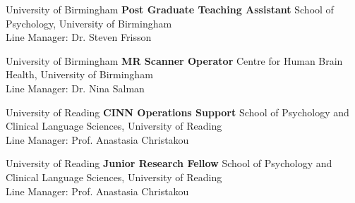 {University of Birmingham}
{\textbf{Post Graduate Teaching Assistant}}
{School of Psychology, University of Birmingham \\
Line Manager: Dr. Steven Frisson}

{University of Birmingham}
{\textbf{MR Scanner Operator}}
{Centre for Human Brain Health, University of Birmingham \\
Line Manager: Dr. Nina Salman}

{University of Reading}
{\textbf{CINN Operations Support}}
{School of Psychology and Clinical Language Sciences, University of Reading \\
Line Manager: Prof. Anastasia Christakou}

{University of Reading}
{\textbf{Junior Research Fellow}}
{School of Psychology and Clinical Language Sciences, University of Reading \\
Line Manager: Prof. Anastasia Christakou}